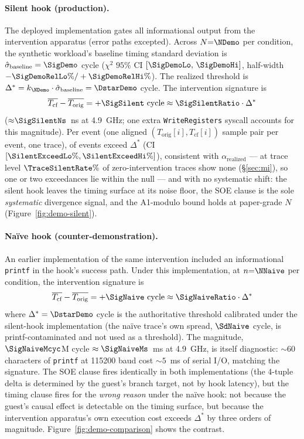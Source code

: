 \documentclass[conference]{IEEEtran}
\newcommand{\sigbase}{\hat{\sigma}_\text{baseline}}
\newcommand{\Dstar}{\Delta^{*}}
\newcommand{\arealized}{\alpha_\text{realized}}
\begin{document}
\paragraph{Silent hook (production).} The deployed implementation
gates all informational output from the intervention apparatus
(error paths excepted). Across $N{=}\NDemo$ per condition, the
synthetic workload's baseline timing standard deviation is
$\sigbase = \SigDemo$ cycle ($\chi^2$ $95\%$ CI
$[\SigDemoLo,\, \SigDemoHi]$, half-width $-\SigDemoRelLo\%/+\SigDemoRelHi\%$). The realized
threshold is $\Dstar = k_{\NDemo} \cdot \sigbase = \DstarDemo$ cycle. The
intervention signature is
\begin{equation*}
\overline{T_\text{cf}} - \overline{T_\text{orig}} = +\SigSilent \text{ cycle} \approx \SigSilentRatio \cdot \Dstar
\end{equation*}
(${\approx}\SigSilentNs$~ns at 4.9~GHz; one extra \texttt{WriteRegisters}
syscall accounts for this magnitude). Per event (one aligned
$(T_\text{orig}[i], T_\text{cf}[i])$ sample pair per event, one trace),
\SilentExceed{} of \NDemo{} events exceed $\Dstar$ (CI
$[\SilentExceedLo\%, \SilentExceedHi\%]$), consistent with $\arealized$
--- at trace level $\TraceSilentRate\%$ of zero-intervention traces show
none (\S\ref{sec:mi}), so one or two exceedances lie within the null ---
and with no systematic shift: the silent hook leaves the timing surface
at its noise floor, the SOE clause is the sole \emph{systematic}
divergence signal, and the A1-modulo bound holds at paper-grade $N$
(Figure~\ref{fig:demo-silent}).

\paragraph{Naïve hook (counter-demonstration).} An earlier
implementation of the same intervention included an informational
\texttt{printf} in the hook's success path. Under this
implementation, at $n{=}\NNaive$ per condition, the intervention
signature is
\begin{equation*}
\overline{T_\text{cf}} - \overline{T_\text{orig}} = +\SigNaive \text{ cycle} \approx \SigNaiveRatio \cdot \Dstar
\end{equation*}
where $\Dstar = \DstarDemo$ cycle is the authoritative threshold
calibrated under the silent-hook implementation (the naïve trace's
own spread, $\SdNaive$ cycle, is printf-contaminated and not used as
a threshold). The magnitude, $\SigNaiveMcyc$M cycle $\approx
\SigNaiveMs$~ms at 4.9~GHz, is itself diagnostic: ${\sim}60$
characters of \texttt{printf} at 115200 baud cost ${\sim}5$~ms of
serial I/O, matching the signature. The SOE clause
fires identically in both implementations (the 4-tuple delta is
determined by the guest's branch target, not by hook latency),
but the timing clause fires for the \emph{wrong reason} under the
naïve hook: not because the guest's causal effect is detectable
on the timing surface, but because the intervention apparatus's
own execution cost exceeds $\Dstar$ by three orders of magnitude.
Figure~\ref{fig:demo-comparison} shows the contrast.
\end{document}
